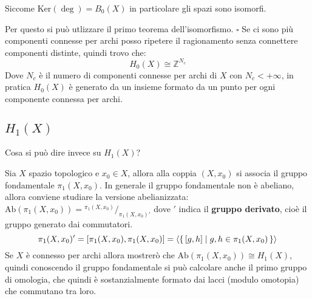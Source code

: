\documentclass[10pt, twoside=false, x11names]{scrbook}
\newenvironment{proof}{{\textbf{Dimostrazione}:}}{\hfill $\square$}
\newcommand{\Z}{\mathbb{Z}}
\renewcommand{\ker}[1]{\mathrm{Ker}( #1)}
\newcommand{\Ab}[1]{\mathrm{Ab}\left( #1 \right)}
\newcommand*\quot[2]{{^{\textstyle #1}\big/_{\textstyle #2}}}
\begin{document}
\begin{proof}
\begin{enumerate}
    Siccome  $ \ker{\deg} = B_0(X) $ in particolare gli spazi sono isomorfi.
  \end{enumerate}
  Per questo si può utlizzare il primo teorema dell'isomorfismo.
\end{proof}
\hfill \newline\newline
Se ci sono più componenti connesse per archi posso ripetere il ragionamento senza connettere componenti
distinte, quindi trovo che:
\[
  H_0(X) \cong \Z^{N_c}
\]
Dove $ N_c $ è il numero di componenti connesse per archi di $ X $ con $ N_c < + \infty $, in pratica
$ H_0(X) $ è generato da un insieme formato da un punto per ogni componente connessa per archi.

\subsection{$ H_1(X) $}

Cosa si può dire invece su $ H_1(X) $?

Sia $ X $ spazio topologico e $ x_0 \in X $, allora alla coppia $ (X, x_0) $ si associa il gruppo fondamentale
$ \pi_1(X,x_0) $. In generale il gruppo fondamentale non è abeliano, allora conviene studiare la versione abelianizzata:
$ \Ab{\pi_1(X,x_0)} = \quot{\pi_1(X,x_0)}{\pi_1(X,x_0)'} $ dove $ ' $ indica il \textbf{gruppo derivato}, cioè il gruppo
generato dai commutatori.
\[
  \pi_1(X,x_0)' = [\pi_1(X,x_0), \pi_1(X,x_0)] = \langle\set{[g,h] | g,h \in \pi_1(X,x_0)}\rangle
\]
Se $ X $ è connesso per archi allora mostrerò che $ \Ab{\pi_1(X,x_0)} \cong H_1(X) $,
quindi conoscendo il gruppo fondamentale si può calcolare anche
il primo gruppo di omologia, che quindi è sostanzialmente formato dai lacci
(modulo omotopia) che commutano tra loro.

\end{document}
